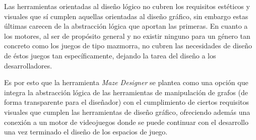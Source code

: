 Las herramientas orientadas al diseño lógico no cubren los requisitos estéticos y visuales que sí cumplen aquellas orientadas al diseño gráfico, sin embargo estas últimas carecen de la abstracción lógica que aportan las primeras.
En cuanto a los motores, al ser de propósito general y no existir ninguno para un género tan concreto como los juegos de tipo mazmorra, no cubren las necesidades de diseño de éstos juegos tan específicamente, dejando la tarea del diseño a los desarrolladores.

Es por esto que la herramienta \textit{Maze Designer} se plantea como una opción que integra la abstracción lógica de las herramientas de manipulación de grafos (de forma transparente para el diseñador) con el cumplimiento de ciertos requisitos visuales que cumplen las herramientas de diseño gráfico, ofreciendo además una conexión a un motor de videojuegos donde se puede continuar con el desarrollo una vez terminado el diseño de los espacios de juego.